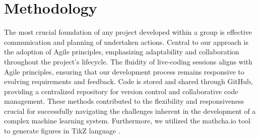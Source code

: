 \section{Methodology}

The most crucial foundation of any project developed within a group is effective communication and planning of undertaken actions. Central to our approach is the adoption of Agile principles, emphasizing adaptability and collaboration throughout the project's lifecycle. The fluidity of live-coding sessions aligns with Agile principles, ensuring that our development process remains responsive to evolving requirements and feedback. Code is stored and shared through GitHub, providing a centralized repository for version control and collaborative code management. These methods contributed to the flexibility and responsiveness crucial for successfully navigating the challenges inherent in the development of a complex machine learning system. Furthermore, we utilized the mathcha.io tool to generate figures in TikZ language \cite{mathcha}.

